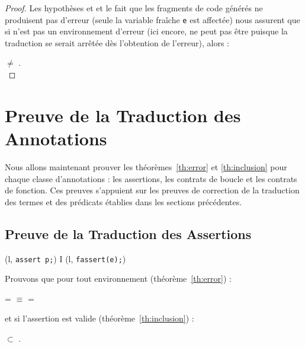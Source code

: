 \begin{proof}
  Les hypothèses  et  et le fait que les fragments de
  code générés ne produisent pas d'erreur (seule la variable fraîche
  \lstinline'e' est affectée) nous assurent que si \env n'est pas un
  environnement d'erreur (ici encore, \env ne peut pas être \errorenv puisque la
  traduction se serait arrêtée dès l'obtention de l'erreur), alors :

   $\neq$ \errorenv.
  ~\\
\end{proof}





\section{Preuve de la Traduction des Annotations}
\label{sec:annotation-translation}


Nous allons maintenant prouver les théorèmes~\ref{th:error} et
\ref{th:inclusion} pour chaque classe d'annotations : les assertions, les
contrats de boucle et les contrats de fonction.
Ces preuves s'appuient sur les preuves de correction de la traduction des termes
et des prédicats établies dans les sections précédentes.


\subsection{Preuve de la Traduction des Assertions}


{
  {(l, \mbox{\lstinline'assert p;'})
     I \concat (l, \mbox{\lstinline'fassert(e);'})}
}


Prouvons que pour tout environnement \env (théorème~\ref{th:error}) :

 = \errorenv
$\equiv$ 
= \errorenv

et si l'assertion est valide (théorème~\ref{th:inclusion}) :

\env $\subset$ .


